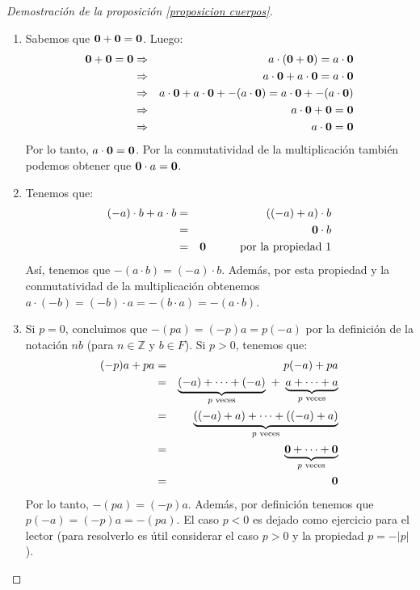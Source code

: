\begin{proof}[Demostración de la proposición \ref{proposicion cuerpos}]\hfill
	\begin{enumerate}
		\item 
		Sabemos que $\mathbf{0}+\mathbf{0} = \mathbf{0}$. Luego:
		\begin{eqnarray*}
\mathbf{0}+\mathbf{0} = \mathbf{0}		&\Rightarrow & a\cdot(\mathbf{0}+\mathbf{0}) = a\cdot \mathbf{0}\\
			&\Rightarrow &a\cdot \mathbf{0}+a\cdot \mathbf{0} = a\cdot \mathbf{0}\\
                        &\Rightarrow &a\cdot \mathbf{0}+a\cdot \mathbf{0} + -(a\cdot \mathbf{0}) = a\cdot \mathbf{0} + -(a \cdot \mathbf{0})\\
                        &\Rightarrow &a\cdot \mathbf{0}+ \mathbf{0} = \mathbf{0}\\
			&\Rightarrow &a\cdot \mathbf{0} = \mathbf{0} 
		\end{eqnarray*}
        Por lo tanto, $a\cdot \mathbf{0}
=\mathbf{0} $. Por la conmutatividad de la multiplicación también podemos
obtener que $\mathbf{0} \cdot a=\mathbf{0} $.

	\item Tenemos que:
        \begin{eqnarray*} (-a)\cdot b + a \cdot b & = & ((-a) +
        a) \cdot b\\ & = & \mathbf{0} \cdot b\\ 
        & = & \mathbf{0} \quad\quad\quad \text{por la propiedad 1}
        \end{eqnarray*}
Así, tenemos que $-(a \cdot b) = (-a)\cdot b$. Además, por esta propiedad y la 
        conmutatividad de la multiplicación obtenemos $a\cdot (-b) = (-b) \cdot a = -(b\cdot a) = -(a\cdot b)$.

        \item Si $p = 0$, concluimos que $-(pa) = (-p)a = p(-a)$ por
        la definición de la notación $nb$ (para $n \in \mathbb{Z}$ y $b \in
        F$). Si $p > 0$, tenemos que:
\begin{eqnarray*}
(-p)a + pa & = & p(-a) + pa\\
& = & \underbrace{(-a) +\cdots + (-a)}_\text{$p$ veces} \ + \ \underbrace{a +\cdots + a}_\text{$p$ veces}\\ 
& = & \underbrace{((-a) + a) + \cdots + ((-a) + a)}_\text{$p$ veces}\\
& = & \underbrace{\0 + \cdots + \0}_\text{$p$ veces}\\
& = & \0
\end{eqnarray*}
Por lo tanto, $-(pa) = (-p)a$. Además, por definición tenemos que $p(-a) = (-p)a = -(pa)$. El caso $p < 0$ es dejado como ejercicio para el lector (para resolverlo es útil considerar el caso $p > 0$ y la propiedad $p = -|p|$). 


\end{enumerate}
\end{proof}
